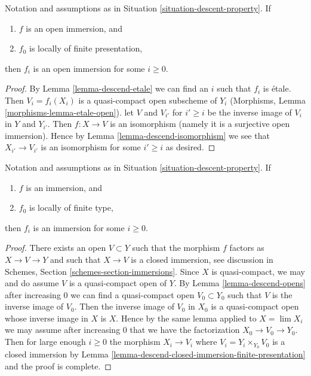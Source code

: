 \begin{lemma}
\label{lemma-descend-open-immersion}
Notation and assumptions as in Situation \ref{situation-descent-property}.
If
\begin{enumerate}
\item $f$ is an open immersion, and
\item $f_0$ is locally of finite presentation,
\end{enumerate}
then $f_i$ is an open immersion for some $i \geq 0$.
\end{lemma}

\begin{proof}
By Lemma \ref{lemma-descend-etale} we can find an $i$ such that $f_i$
is \'etale. Then $V_i = f_i(X_i)$ is a quasi-compact open subscheme
of $Y_i$ (Morphisms, Lemma \ref{morphisms-lemma-etale-open}).
let $V$ and $V_{i'}$ for $i' \geq i$ be the inverse image of $V_i$
in $Y$ and $Y_{i'}$. Then $f : X \to V$ is an isomorphism
(namely it is a surjective open immersion). Hence by
Lemma \ref{lemma-descend-isomorphism} we see that
$X_{i'} \to V_{i'}$ is an isomorphism
for some $i' \geq i$ as desired.
\end{proof}

\begin{lemma}
\label{lemma-descend-immersion}
Notation and assumptions as in Situation \ref{situation-descent-property}.
If
\begin{enumerate}
\item $f$ is an immersion, and
\item $f_0$ is locally of finite type,
\end{enumerate}
then $f_i$ is an immersion for some $i \geq 0$.
\end{lemma}

\begin{proof}
There exists an open $V \subset Y$ such that the morphism
$f$ factors as $X \to V \to Y$ and such that $X \to V$ is
a closed immersion, see discussion in
Schemes, Section \ref{schemes-section-immersions}.
Since $X$ is quasi-compact, we may and do assume $V$ is a quasi-compact open
of $Y$. By Lemma \ref{lemma-descend-opens} after increasing $0$
we can find a quasi-compact open $V_0 \subset Y_0$ such that
$V$ is the inverse image of $V_0$. Then the inverse image of
$V_0$ in $X_0$ is a quasi-compact open whose inverse image in $X$ is $X$.
Hence by the same lemma applied to $X = \lim X_i$ we may
assume after increasing $0$ that we have the factorization
$X_0 \to V_0 \to Y_0$. Then for large enough $i \geq 0$ the morphism
$X_i \to V_i$ where $V_i = Y_i \times_{Y_0} V_0$ is a closed immersion by
Lemma \ref{lemma-descend-closed-immersion-finite-presentation}
and the proof is complete.
\end{proof}

